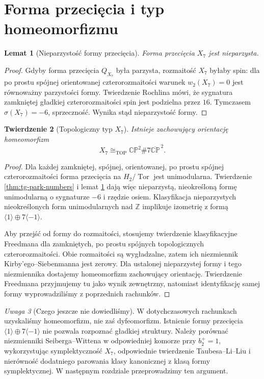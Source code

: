 \documentclass[11pt,a4paper]{report}
\numberwithin{equation}{section}
\theoremstyle{plain}
\newtheorem{twierdzenie}{Twierdzenie}[section]
\newtheorem{lemat}[twierdzenie]{Lemat}
\theoremstyle{definition}
\theoremstyle{remark}
\newtheorem{uwaga}[twierdzenie]{Uwaga}
\begin{document}
\section{Forma przecięcia i typ homeomorfizmu}
\label{sec:tg-park-homeo}

\begin{lemat}[Nieparzystość formy przecięcia]
\label{lem:tg-park-odd}
Forma przecięcia $X_7$ jest nieparzysta.
\end{lemat}

\begin{proof}
Gdyby forma przecięcia $Q_{X_7}$ była parzysta,
rozmaitość $X_7$ byłaby spin: dla po prostu spójnej
orientowanej czterorozmaitości warunek
$w_2(X_7)=0$ jest równoważny parzystości formy.
Twierdzenie Rochlina mówi, że sygnatura zamkniętej
gładkiej czterorozmaitości spin jest podzielna przez $16$.
Tymczasem $\sigma(X_7)=-6$, sprzeczność.
Wynika stąd nieparzystość formy.
\end{proof}

\begin{twierdzenie}[Topologiczny typ $X_7$]
\label{thm:tg-park-homeo}
Istnieje zachowujący orientację homeomorfizm
\[
X_7\cong_{\mathrm{TOP}}
\mathbb{CP}^{2}\#7\overline{\mathbb{CP}}^{\,2}.
\]
\end{twierdzenie}

\begin{proof}
Dla każdej zamkniętej, spójnej, orientowanej, po prostu
spójnej czterorozmaitości forma przecięcia na
$H_2/\operatorname{Tor}$ jest unimodularna.
Twierdzenie \ref{thm:tg-park-numbers} i lemat
\ref{lem:tg-park-odd} dają więc nieparzystą,
nieokreśloną formę unimodularną o sygnaturze $-6$
i rzędzie osiem. Klasyfikacja nieparzystych
nieokreślonych form unimodularnych nad $\mathbb Z$
implikuje izometrię z formą
$\langle1\rangle\oplus7\langle-1\rangle$.

Aby przejść od formy do rozmaitości, stosujemy twierdzenie
klasyfikacyjne Freedmana dla zamkniętych, po prostu
spójnych topologicznych czterorozmaitości.
Obie rozmaitości są wygładzalne, zatem ich niezmiennik
Kirby'ego--Siebenmanna jest zerowy. Dla ustalonej
nieparzystej formy i tego niezmiennika dostajemy
homeomorfizm zachowujący orientację.
Twierdzenie Freedmana przyjmujemy tu jako wynik
zewnętrzny, natomiast identyfikację samej formy
wyprowadziliśmy z poprzednich rachunków.
\end{proof}

\begin{uwaga}[Czego jeszcze nie dowiedliśmy]
W dotychczasowych rachunkach uzyskaliśmy homeomorfizm,
nie zaś dyfeomorfizm. Istnienie formy przecięcia
$\langle1\rangle\oplus7\langle-1\rangle$ nie pozwala
rozpoznać gładkiej struktury. Należy porównać
niezmienniki Seiberga--Wittena w odpowiedniej komorze
przy $b_2^+=1$, wykorzystując symplektyczność $X_7$,
odpowiednie twierdzenie Taubesa--Li--Liu i nierówność
dodatniego parowania klasy kanonicznej z klasą formy
symplektycznej. W następnym rozdziale przeprowadzimy ten argument.
\end{uwaga}
\end{document}

